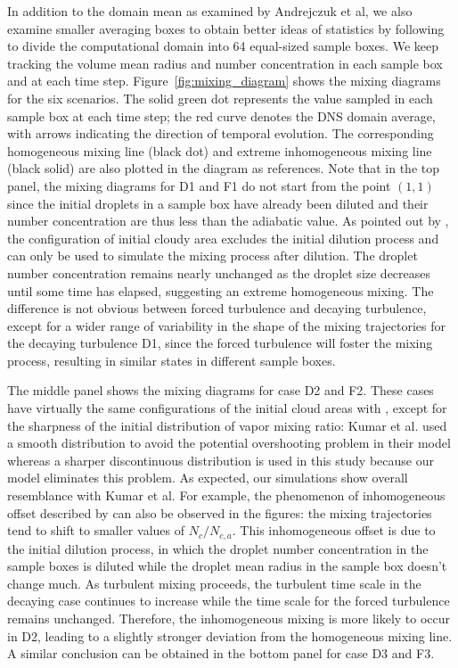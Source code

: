 \documentclass[draft,linenumbers]{agujournal}
\newcommand{\Fig}[1]{Figure~\ref{#1}}
\begin{document}
In addition to the domain mean as examined by Andrejczuk et al, we also examine smaller averaging boxes to obtain better ideas of statistics by following \citet{Kumar14} to divide the computational domain into 64 equal-sized sample boxes. We keep tracking the volume mean radius and number concentration in each sample box and at each time step. \Fig{fig:mixing_diagram} shows the mixing diagrams for the six scenarios. The solid green dot represents the value sampled in each sample box at each time step; the red curve denotes the DNS domain average, with arrows indicating the direction of temporal evolution. The corresponding homogeneous mixing line (black dot) and extreme inhomogeneous mixing line (black solid) are also plotted in the diagram as references. Note that in the top panel, the mixing diagrams for D1 and F1 do not start from the point $(1,1)$ since the initial droplets in a sample box have already been diluted and their number concentration are thus less than the adiabatic value. As pointed out by \citet{And04}, the configuration of initial cloudy area excludes the initial dilution process and can only be used to simulate the mixing process after dilution. The droplet number concentration remains nearly unchanged as the droplet size decreases until some time has elapsed, suggesting an extreme homogeneous mixing. The difference is not obvious between forced turbulence and decaying turbulence, except for a wider range of variability in the shape of the mixing trajectories for the decaying turbulence D1, since the forced turbulence will foster the mixing process, resulting in similar states in different sample boxes. 

The middle panel shows the mixing diagrams for case D2 and F2. These cases have virtually the same configurations {of the initial cloud areas} with \citet{Kumar14}, except { for the sharpness of the initial distribution of vapor mixing ratio: Kumar et al. used a smooth distribution to avoid the potential overshooting problem in their model whereas a sharper discontinuous distribution is used in this study because our model eliminates this problem. As expected, our simulations show overall resemblance with Kumar et al. For example,} the phenomenon of inhomogeneous offset described by \citet{Kumar14} can also be observed in the figures: the mixing trajectories tend to shift to smaller values of $N_c/N_{c,a}$. This inhomogeneous offset is due to the initial dilution process, in which the droplet number concentration in the sample boxes is diluted while the droplet mean radius in the sample box doesn't change much. As turbulent mixing proceeds, the turbulent time scale in the decaying case continues to increase while the time scale for the forced turbulence remains unchanged. Therefore, the inhomogeneous mixing is more likely to occur in D2, leading to a slightly stronger deviation from the homogeneous mixing line.  A similar conclusion can be obtained in the bottom panel for case D3 and F3. 
\end{document}

